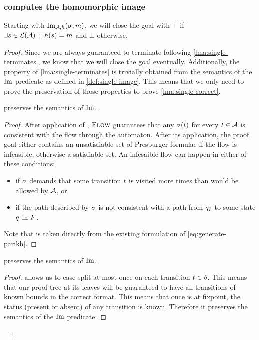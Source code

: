 \documentclass[acmsmall,review,anonymous,screen]{acmart}\settopmatter{printfolios=true,printccs=false,printacmref=true}
\theoremstyle{definition}
\begin{document}
\subsubsection{\Calculus{} computes the homomorphic image}
\begin{lemma}\label{lma:single-correct}
  Starting with $\operatorname{Im}_{\mathcal{A}, h}(\operatorname{\sigma}, m)$, we will close the goal with $\top$
  if $\exists s \in \operatorname{\mathcal{L}}(\mathcal{A}) \::\: h(s) = m$
  and $\bot$ otherwise.
\end{lemma}
\begin{proof}
Since we are always guaranteed to terminate following
\cref{lma:single-terminates}, we know that we will close the goal eventually.
Additionally, the property of \cref{lma:single-terminates} is trivially obtained
from the semantics of the $\operatorname{Im}$ predicate as defined in
\cref{def:single-image}. This means that we only need to prove the preservation
of those properties to prove \cref{lma:single-correct}.

\begin{lemma}\label{lma:expand-preserves}
  \Expand{} preserves the semantics of $\operatorname{Im}$.
\end{lemma}
\begin{proof}

  After application of \Expand{}, $\textsc{Flow}$ guarantees that any
  $\operatorname{\sigma}(t)$  for every $t \in \mathcal{A}$ is consistent
  with the flow through the automaton. After its application, the proof goal
  either contains an unsatisfiable set of Presburger formulae if the flow is
  infeasible, otherwise a satisfiable set. An infesaible flow can happen in
  either of these conditions:
  \begin{itemize}
    \item if $\operatorname{\sigma}$ demands that some transition $t$ is visited more times than would be allowed by $\mathcal{A}$, or
    \item if the path described by $\operatorname{\sigma}$ is not consistent with a path from
    $q_I$ to some state $q$ in $F$.
  \end{itemize}

  Note that \Expand{} is taken directly from the existing formulation of
  \cref{eq:generate-parikh}.
\end{proof}

\begin{lemma}\label{lma:split-preserves}
  \Split{} preserves the semantics of $\operatorname{Im}$.
\end{lemma}
\begin{proof}
  \Split{} allows us to case-split at most once on each transition $t
  \in \delta$. This means that our proof tree at its leaves will be
  guaranteed to have all transitions of known bounds in the correct format. This
  means that once \Split{} is at fixpoint, the status (present or absent) of any
  transition is known. Therefore it preserves the semantics of the $\operatorname{Im}$
  predicate.
\end{proof}


\end{proof}
\end{document}
